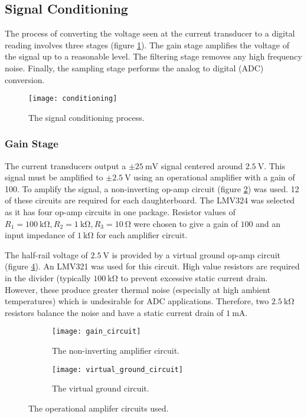 \subsection{Signal Conditioning}

The process of converting the voltage seen at the current transducer to a digital reading involves three stages (figure \ref{fig:conditioning}).
The gain stage amplifies the voltage of the signal up to a reasonable level.
The filtering stage removes any high frequency noise.
Finally, the sampling stage performs the analog to digital (ADC) conversion.
\begin{figure}[H]
	\centering
	\texttt{[image: conditioning]}
	\caption{The signal conditioning process.}
	\label{fig:conditioning}
\end{figure}

\subsubsection{Gain Stage}

The current transducers output a $\pm \SI{25}{\milli\volt}$ signal centered around $\SI{2.5}{\volt}$.
This signal must be amplified to $\pm \SI{2.5}{\volt}$ using an operational amplifier with a gain of 100.
To amplify the signal, a non-inverting op-amp circuit (figure \ref{fig:non-inverting-op-amp}) was used.
12 of these circuits are required for each daughterboard.
The LMV324 was selected as it has four op-amp circuits in one package.
Resistor values of $R_1 = \SI{100}{\kilo\ohm}, R_2 = \SI{1}{\kilo\ohm}, R_3 = \SI{10}{\ohm}$ were chosen to give a gain of $100$ and an input impedance of $\SI{1}{\kilo\ohm}$ for each amplifier circuit.

The half-rail voltage of $\SI{2.5}{\volt}$ is provided by a virtual ground op-amp circuit (figure \ref{fig:half-supply}).
An LMV321 was used for this circuit.
High value resistors are required in the divider (typically $\SI{100}{\kilo\ohm}$ to prevent excessive static current drain.
However, these produce greater thermal noise (especially at high ambient temperatures) which is undesirable for ADC applications.
Therefore, two $\SI{2.5}{\kilo\ohm}$ resistors balance the noise and have a static current drain of $\SI{1}{\milli\ampere}$.

\begin{figure}[hb]
\centering

\begin{subfigure}[c]{0.45\textwidth}
	\centering
	\texttt{[image: gain\_circuit]}
	\caption{The non-inverting amplifier circuit.}
	\label{fig:non-inverting-op-amp}
\end{subfigure}
\hfill
\begin{subfigure}[c]{0.45\textwidth}
	\centering
	\vfill
	\texttt{[image: virtual\_ground\_circuit]}
	\vfill
	\caption{The virtual ground circuit.}
	\label{fig:half-supply}
\end{subfigure}

\caption{The operational amplifer circuits used.}
\end{figure}


